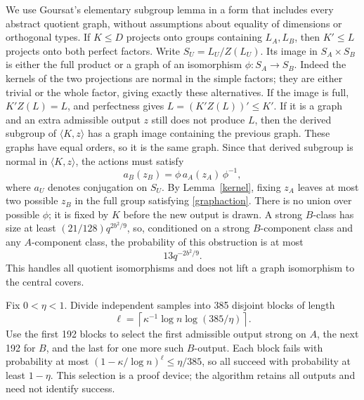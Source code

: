\documentclass[11pt]{article}
\begin{document}
We use Goursat's elementary subgroup lemma in a form that includes every abstract quotient graph, without assumptions about equality of dimensions or orthogonal types. If $K\le D$ projects onto groups containing $L_A,L_B$, then $K'\le L$ projects onto both perfect factors. Write $S_U=L_U/Z(L_U)$. Its image in $S_A\times S_B$ is either the full product or a graph of an isomorphism $\phi:S_A\to S_B$. Indeed the kernels of the two projections are normal in the simple factors; they are either trivial or the whole factor, giving exactly these alternatives. If the image is full, $K'Z(L)=L$, and perfectness gives $L=(K'Z(L))'\le K'$. If it is a graph and an extra admissible output $z$ still does not produce $L$, then the derived subgroup of $\langle K,z\rangle$ has a graph image containing the previous graph. These graphs have equal orders, so it is the same graph. Since that derived subgroup is normal in $\langle K,z\rangle$, the actions must satisfy
\begin{equation}\label{graphaction}
a_B(z_B)=\phi\,a_A(z_A)\,\phi^{-1},
\end{equation}
where $a_U$ denotes conjugation on $S_U$. By Lemma~\ref{kernel}, fixing $z_A$ leaves at most two possible $z_B$ in the full group satisfying \eqref{graphaction}. There is no union over possible $\phi$; it is fixed by $K$ before the new output is drawn. A strong $B$-class has size at least $(21/128)q^{2b^2/9}$, so, conditioned on a strong $B$-component class and any $A$-component class, the probability of this obstruction is at most
\begin{equation}\label{graphtail}
13q^{-2b^2/9}.
\end{equation}
This handles all quotient isomorphisms and does not lift a graph isomorphism to the central covers.

Fix $0<\eta<1$. Divide independent samples into 385 disjoint blocks of length
\[
\ell=\left\lceil\kappa^{-1}\log n\log(385/\eta)\right\rceil.
\]
Use the first 192 blocks to select the first admissible output strong on $A$, the next 192 for $B$, and the last for one more such $B$-output. Each block fails with probability at most $(1-\kappa/\log n)^\ell\le\eta/385$, so all succeed with probability at least $1-\eta$. This selection is a proof device; the algorithm retains all outputs and need not identify success.
\end{document}

